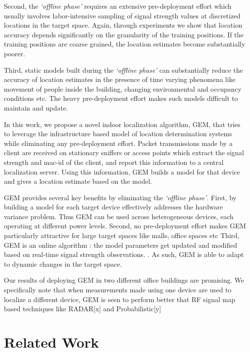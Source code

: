 \documentclass{Localization-PaperWriteupDraft}
\begin{document}
Second, the {\it `offline phase'} requires an extensive pre-deployment effort which usually involves labor-intensive sampling of signal strength values at discretized locations in the target space. Again, through experiments we show that location accuracy depends significantly on the granularity of the training positions. If the training positions are coarse grained, the location estimates become substantially poorer.

Third, static models built during the {\it `offline phase'} can substantially reduce the accuracy of location estimates in the presence of time varying phenomena like movement of people inside the building, changing environmental and occupancy conditions etc. The heavy pre-deployment effort makes such models difficult to maintain and update. 

In this work, we propose a novel indoor localization algorithm, GEM, that tries to leverage the infrastructure based model of location determination systems while eliminating any pre-deployment effort. Packet transmissions made by a client are received on stationary sniffers or access points which extract the signal strength and mac-id of the client, and report this information to a central localization server. Using this information, GEM builds a model for that device and gives a location estimate based on the model. 

GEM provides several key benefits by eliminating the {\it `offline phase'}. First, by building a model for each target device effectively addresses the hardware variance problem. Thus GEM can be used across heterogeneous devices, each operating at different power levels.  Second, no pre-deployment effort makes GEM particularly attractive for large target spaces like malls, office spaces etc  Third, GEM is an online algorithm : the model parameters get updated and modified based on real-time signal strength observations. . As such, GEM is able to adapt to dynamic changes in the target space.

Our results of deploying GEM in two different office buildings are promising. We specifically note that when measurements made using one device are used to localize a different device,  GEM is seen to perform better that RF signal map based techniques like RADAR[x] and Probabilistic[y]

\section{Related Work}
\label{sec:relatedwork}
\end{document}
